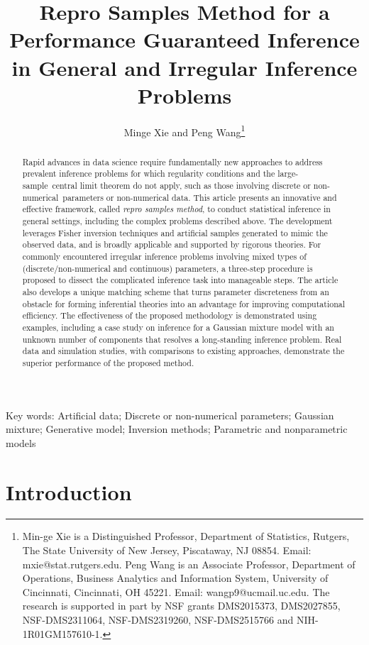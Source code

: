 \documentclass[12pt]{article}
\title{\large
Repro Samples Method for a Performance Guaranteed
Inference in General and Irregular Inference Problems}
\author{Minge Xie and Peng Wang\footnote{Min-ge Xie is a Distinguished Professor, Department of Statistics, Rutgers, The State University of New Jersey, Piscataway, NJ 08854. Email: mxie@stat.rutgers.edu. Peng Wang is an Associate Professor, Department of Operations, Business Analytics and Information System,  University of Cincinnati, Cincinnati, OH 45221. Email: wangp9@ucmail.uc.edu.  The research is supported in part by NSF grants DMS2015373, DMS2027855, 
 NSF-DMS2311064, NSF-DMS2319260, NSF-DMS2515766 and NIH-1R01GM157610-1.}}
\date{}
\theoremstyle{shortspace}
\begin{document}
\def\spacingset#1{\renewcommand{\baselinestretch}%
{#1}\small\normalsize} \spacingset{1}


\maketitle

\thispagestyle{empty}
\begin{abstract} 
Rapid advances in data science require fundamentally new approaches to address prevalent inference problems for which regularity conditions and the large-sample~central limit theorem do not apply, such as those involving discrete or non-numerical~parameters or non-numerical data. This article presents an innovative and effective framework, called {\it repro samples method}, to conduct statistical inference in general settings, including the complex problems described above. The development leverages Fisher inversion techniques and artificial samples generated to mimic the observed data, and is broadly applicable and supported by rigorous theories. 
For commonly encountered irregular inference problems involving mixed types of (discrete/non-numerical and continuous) parameters, a three-step procedure is proposed to dissect the complicated inference task into manageable steps. The article also develops a unique matching scheme that turns parameter discreteness from an obstacle for forming inferential theories into an advantage for improving computational efficiency. The effectiveness of the proposed methodology is demonstrated using examples, including a case study on inference for a Gaussian mixture model with an unknown number of components that resolves a long-standing %
inference problem. Real data and simulation studies, with comparisons to existing approaches, demonstrate the superior performance of the proposed method. 
\end{abstract}




\vspace{-1.5mm}
\noindent 
Key words: Artificial  data; 
Discrete or non-numerical parameters;  Gaussian mixture; Generative model;  Inversion methods;
Parametric and nonparametric models

\spacingset{2}

\newpage
 \setcounter{page}{1} 


\vspace{-2mm}
\section{
Introduction}\label{sec:intr}
\vspace{-1mm}
\end{document}
